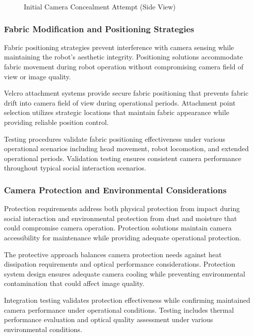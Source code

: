\begin{figure}[H]
\begin{minipage}{0.45\textwidth}
        \caption{Initial Camera Concealment Attempt (Side View)}
        \label{fig:camera_hiding_mesh}
    \end{minipage}
\end{figure}

\subsubsection{Fabric Modification and Positioning Strategies}

Fabric positioning strategies prevent interference with camera sensing while maintaining the robot's aesthetic integrity. Positioning solutions accommodate fabric movement during robot operation without compromising camera field of view or image quality.

Velcro attachment systems provide secure fabric positioning that prevents fabric drift into camera field of view during operational periods. Attachment point selection utilizes strategic locations that maintain fabric appearance while providing reliable position control.

Testing procedures validate fabric positioning effectiveness under various operational scenarios including head movement, robot locomotion, and extended operational periods. Validation testing ensures consistent camera performance throughout typical social interaction scenarios.

\subsubsection{Camera Protection and Environmental Considerations}

Protection requirements address both physical protection from impact during social interaction and environmental protection from dust and moisture that could compromise camera operation. Protection solutions maintain camera accessibility for maintenance while providing adequate operational protection.

The protective approach balances camera protection needs against heat dissipation requirements and optical performance considerations. Protection system design ensures adequate camera cooling while preventing environmental contamination that could affect image quality.

Integration testing validates protection effectiveness while confirming maintained camera performance under operational conditions. Testing includes thermal performance evaluation and optical quality assessment under various environmental conditions.

